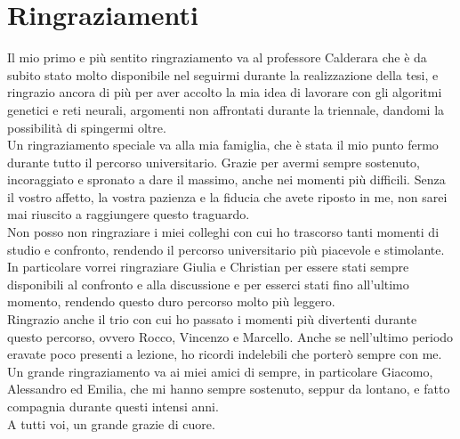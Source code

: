 \documentclass[12pt,a4paper,onecolumn,openright]{book}
\begin{document}
\newpage
\chapter*{Ringraziamenti}
\thispagestyle{empty} %

Il mio primo e più sentito ringraziamento va al professore Calderara che è da subito stato molto disponibile nel seguirmi durante la realizzazione della tesi, e ringrazio ancora di più per aver accolto la mia idea di lavorare con gli algoritmi genetici e reti neurali, argomenti non affrontati durante la triennale, dandomi la possibilità di spingermi oltre.\\

Un ringraziamento speciale va alla mia famiglia, che è stata il mio punto fermo durante tutto il percorso universitario. Grazie per avermi sempre sostenuto, incoraggiato e spronato a dare il massimo, anche nei momenti più difficili. Senza il vostro affetto, la vostra pazienza e la fiducia che avete riposto in me, non sarei mai riuscito a raggiungere questo traguardo.\\

Non posso non ringraziare i miei colleghi con cui ho trascorso tanti momenti di studio e confronto, rendendo il percorso universitario più piacevole e stimolante.\\ In particolare vorrei ringraziare Giulia e Christian per essere stati sempre disponibili al confronto e alla discussione e per esserci stati fino all'ultimo momento, rendendo questo duro percorso molto più leggero.\\ Ringrazio anche il trio con cui ho passato i momenti più divertenti durante questo percorso, ovvero Rocco, Vincenzo e Marcello. Anche se nell'ultimo periodo eravate poco presenti a lezione, ho ricordi indelebili che porterò sempre con me.\\

Un grande ringraziamento va ai miei amici di sempre, in particolare Giacomo, Alessandro ed Emilia, che mi hanno sempre sostenuto, seppur da lontano, e fatto compagnia durante questi intensi anni.\\

A tutti voi, un grande grazie di cuore.
\newpage
\end{document}
